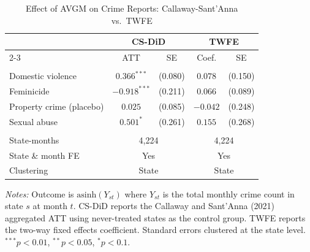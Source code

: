 \begin{table}[!t]
\centering
\caption{Effect of AVGM on Crime Reports: Callaway-Sant'Anna vs.\ TWFE}
\label{tab:main}
\begin{threeparttable}
\begin{tabular}{lcccc}
\hline\hline
 & \multicolumn{2}{c}{CS-DiD} & \multicolumn{2}{c}{TWFE} \\
\cline{2-3} \cline{4-5}
 & ATT & SE & Coef. & SE \\
\hline
\\[-1.8ex]
Domestic violence & $0.366^{***}$ & (0.080) & $0.078$ & (0.150) \\
Feminicide & $-0.918^{***}$ & (0.211) & $0.066$ & (0.089) \\
Property crime (placebo) & $0.025$ & (0.085) & $-0.042$ & (0.248) \\
Sexual abuse & $0.501^{*}$ & (0.261) & $0.155$ & (0.268) \\
\\[-1.8ex]
\hline
State-months & \multicolumn{2}{c}{4,224} & \multicolumn{2}{c}{4,224} \\
State \& month FE & \multicolumn{2}{c}{Yes} & \multicolumn{2}{c}{Yes} \\
Clustering & \multicolumn{2}{c}{State} & \multicolumn{2}{c}{State} \\
\hline\hline
\end{tabular}
\begin{tablenotes}
\item \textit{Notes:} Outcome is $\text{asinh}(Y_{st})$ where $Y_{st}$ is the total monthly crime count in state $s$ at month $t$. CS-DiD reports the Callaway and Sant'Anna (2021) aggregated ATT using never-treated states as the control group. TWFE reports the two-way fixed effects coefficient. Standard errors clustered at the state level. $^{***}p<0.01$, $^{**}p<0.05$, $^{*}p<0.1$.
\end{tablenotes}
\end{threeparttable}
\end{table}

